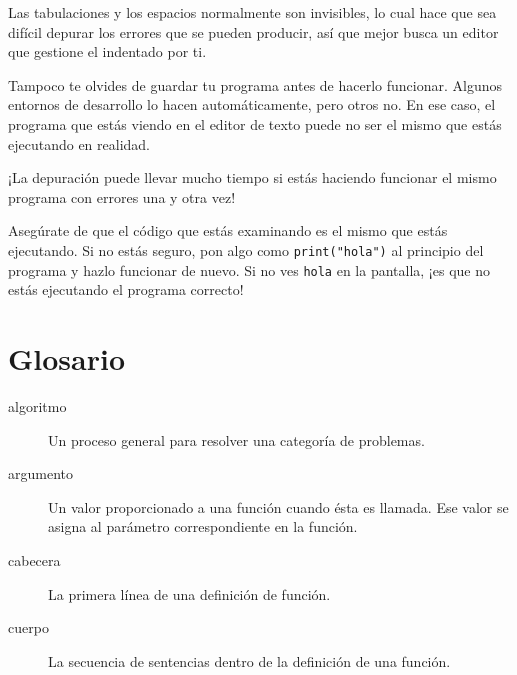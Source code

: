 
Las tabulaciones y los espacios normalmente son invisibles, lo cual hace
que sea difícil depurar los errores que se pueden producir, así que
mejor busca un editor que gestione el indentado por ti.

Tampoco te olvides de guardar tu programa antes de hacerlo funcionar.
Algunos entornos de desarrollo lo hacen automáticamente, pero otros no.
En ese caso, el programa que estás viendo en el editor de texto puede no
ser el mismo que estás ejecutando en realidad.

¡La depuración puede llevar mucho tiempo si estás haciendo funcionar el
mismo programa con errores una y otra vez!

Asegúrate de que el código que estás examinando es el mismo que estás
ejecutando. Si no estás seguro, pon algo como \texttt{print("hola")} al
principio del programa y hazlo funcionar de nuevo. Si no ves
\texttt{hola} en la pantalla, ¡es que no estás ejecutando el programa
correcto!

\hypertarget{glosario}{%
\section{Glosario}\label{glosario}}

\begin{description}
\item[algoritmo]
Un proceso general para resolver una categoría de problemas.
\end{description}


\begin{description}
\item[argumento]
Un valor proporcionado a una función cuando ésta es llamada. Ese valor
se asigna al parámetro correspondiente en la función.
\end{description}


\begin{description}
\item[cabecera]
La primera línea de una definición de función.
\end{description}


\begin{description}
\item[cuerpo]
La secuencia de sentencias dentro de la definición de una función.
\end{description}

